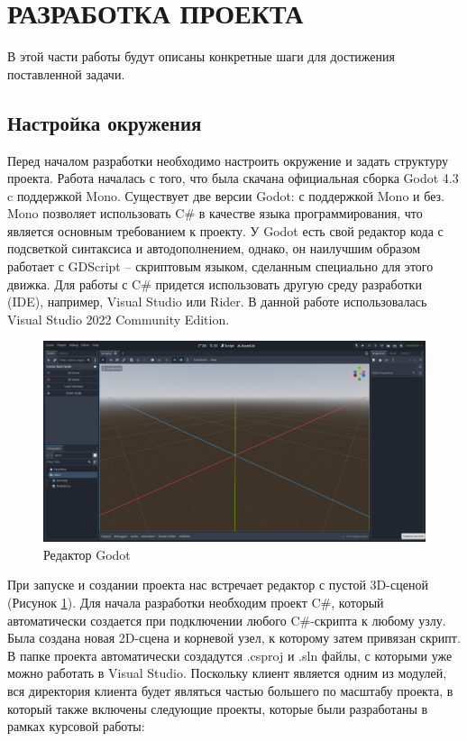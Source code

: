 \section{РАЗРАБОТКА ПРОЕКТА}

        В этой части работы будут описаны конкретные шаги для достижения поставленной задачи.

    \subsection{Настройка окружения}

        Перед началом разработки необходимо настроить окружение и задать структуру проекта. Работа началась с того, что была скачана официальная сборка Godot 4.3 c поддержкой Mono. Существует две версии Godot: с поддержкой Mono и без. Mono позволяет использовать C\# в качестве языка программирования, что является основным требованием к проекту. У Godot есть свой редактор кода с подсветкой синтаксиса и автодополнением, однако, он наилучшим образом работает с GDScript -- скриптовым языком, сделанным специально для этого движка. Для работы с C\# придется использовать другую среду разработки (IDE), например, Visual Studio или Rider. В данной работе использовалась Visual Studio 2022 Community Edition. 
        \begin{figure}[H]
            \centering
            \includegraphics[width=\textwidth]{pictures/godot-editor.png}
            \caption{Редактор Godot}\label{ris2.1}
        \end{figure}
        При запуске и создании проекта нас встречает редактор с пустой 3D-сценой (Рисунок \ref{ris2.1}). Для начала разработки необходим проект C\#, который автоматически создается при подключении любого C\#-скрипта к любому узлу. Была создана новая 2D-сцена и корневой узел, к которому затем привязан скрипт. В папке проекта автоматически создадутся .csproj и .sln файлы, с которыми уже можно работать в Visual Studio. Поскольку клиент является одним из модулей, вся директория клиента будет являться частью большего по масштабу проекта, в который также включены следующие проекты, которые были разработаны в рамках курсовой работы:

